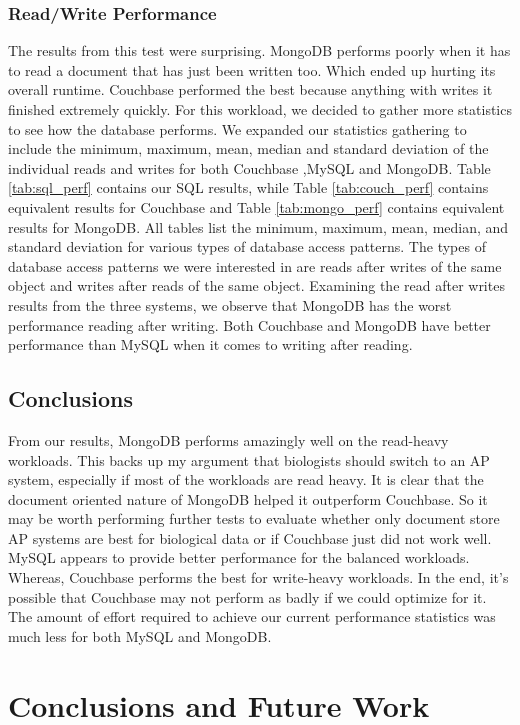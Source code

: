 \documentclass[12pt]{ucthesis}
\begin{document}
\subsection{Read/Write Performance}
The results from this test were surprising. MongoDB performs poorly when it has
to read a document that has just been written too. Which ended up hurting
its overall runtime. Couchbase
performed the best because anything with writes it finished extremely quickly.
For this workload, we decided to gather more statistics to see how the
database performs. We expanded our statistics gathering to include the minimum,
maximum, mean, median and standard deviation of the individual reads and writes
for both Couchbase ,MySQL and MongoDB. Table \ref{tab:sql_perf} contains our SQL
results, while Table \ref{tab:couch_perf} contains equivalent results for
Couchbase and Table \ref{tab:mongo_perf} contains equivalent results for MongoDB.
All tables list the minimum, maximum, mean, median, and standard
deviation for various types of database access patterns. The types of database
access patterns we were interested in are reads after writes of the same object
and writes after reads of the same object. Examining the read after writes results
from the three systems, we observe
that MongoDB has the worst performance reading after writing. Both Couchbase and MongoDB have
better performance than MySQL when it comes to writing after reading.

\section{Conclusions}\label{sec:conclusions}
From our results, MongoDB performs amazingly well on the read-heavy workloads.
This backs up my argument that biologists should switch to an AP system, especially if
most of the workloads are read heavy. It is clear that the document oriented nature
of MongoDB helped it outperform Couchbase. So it may be worth performing further tests to evaluate
whether only document store AP systems are best for biological data or if Couchbase just did not work well.
MySQL appears to provide better performance for the balanced workloads. Whereas, Couchbase
performs the best for write-heavy workloads. In the end, it's possible that Couchbase may not perform as badly if we could optimize for it. The amount of effort required to achieve our current
performance statistics was much less for both MySQL and MongoDB.

\chapter{Conclusions and Future Work}
\label{conclusions}
\end{document}
